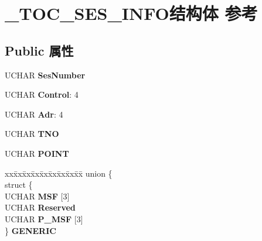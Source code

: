 \hypertarget{struct___t_o_c___s_e_s___i_n_f_o}{}\section{\+\_\+\+T\+O\+C\+\_\+\+S\+E\+S\+\_\+\+I\+N\+F\+O结构体 参考}
\label{struct___t_o_c___s_e_s___i_n_f_o}
\subsection*{Public 属性}
\begin{DoxyCompactItemize}
\item 
\mbox{\label{struct___t_o_c___s_e_s___i_n_f_o_a532acde40d24e70de5dd114c33992d85}} 
U\+C\+H\+AR {\bfseries Ses\+Number}
\item 
\mbox{\label{struct___t_o_c___s_e_s___i_n_f_o_a94bd69dd205281f75ffa399cfa8b3a37}} 
U\+C\+H\+AR {\bfseries Control}\+: 4
\item 
\mbox{\label{struct___t_o_c___s_e_s___i_n_f_o_aca742cc56f9e4ae549c60b0b46ea5d25}} 
U\+C\+H\+AR {\bfseries Adr}\+: 4
\item 
\mbox{\label{struct___t_o_c___s_e_s___i_n_f_o_afee27581351731a135c8276bcf15b9eb}} 
U\+C\+H\+AR {\bfseries T\+NO}
\item 
\mbox{\label{struct___t_o_c___s_e_s___i_n_f_o_a6e58950db009a9361ecfb224122d1dce}} 
U\+C\+H\+AR {\bfseries P\+O\+I\+NT}
\item 
\mbox{\label{struct___t_o_c___s_e_s___i_n_f_o_ab90b839fbe85a34bfa69d004f5878a9e}} 
\begin{tabbing}
xx\=xx\=xx\=xx\=xx\=xx\=xx\=xx\=xx\=\kill
union \{\\
\>struct \{\\
\>\>UCHAR {\bfseries MSF} \mbox{[}3\mbox{]}\\
\>\>UCHAR {\bfseries Reserved}\\
\>\>UCHAR {\bfseries P\_MSF} \mbox{[}3\mbox{]}\\
\>\} {\bfseries GENERIC}\\

\end{tabbing}
\end{DoxyCompactItemize}
